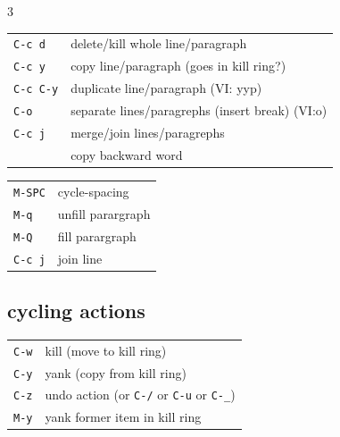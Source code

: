 \documentclass[11pt,landscape,a4paper]{article}
\begin{document}
\begin{multicols}{3}
\begin{tabular}{@{}ll@{}}
	{\color{darkred}\verb|C-c d|} 	& delete/kill whole line/paragraph	\\ 
	{\color{darkred}\verb|C-c y|} 	& copy line/paragraph	(goes in kill ring?)  \\
	{\color{darkred}\verb|C-c C-y|} & duplicate line/paragraph (VI: yyp) \\
	{\verb|C-o|} 					& separate lines/paragrephs (insert break) (VI:o)\\
	{\color{darkred}\verb|C-c j|}	& merge/join lines/paragrephs\\
	{\color{darkred}\verb| |} 		& copy backward word\\
\end{tabular}

\begin{tabular}{@{}ll@{}}
	{\color{cblue}\verb|M-SPC|} & cycle-spacing\\ %
	{\color{cblue}\verb|M-q|} 						&  unfill parargraph\\ 
	{\color{darkred}\verb|M-Q|} 					&  fill parargraph\\ 
	{\color{darkred}\verb|C-c j|} 			& join line 
\end{tabular}


%


\subsection{cycling actions}

\begin{tabular}{@{}ll@{}}
	{\color{cblue}\verb|C-w|} 		& kill (move to kill ring)\\
	{\color{cblue}\verb|C-y|} 		& yank (copy from kill ring)\\
	{\verb|C-z|} 		& undo action (or \verb|C-/| or \verb|C-u| or \verb|C-_|)\\
	{\color{cblue}\verb|M-y|} 		& yank former item in kill ring\\
\end{tabular}


\end{multicols}
\end{document}
